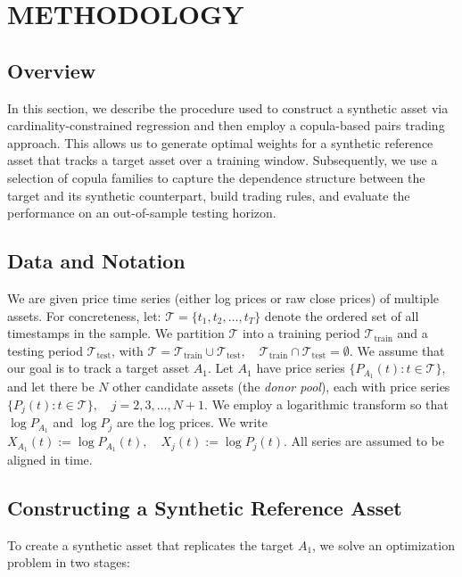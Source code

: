 
\maketitle

\section*{METHODOLOGY}

\subsection*{Overview}
In this section, we describe the procedure used to construct a synthetic asset via cardinality-constrained regression and then employ a copula-based pairs trading approach. This allows us to generate optimal weights for a synthetic reference asset that tracks a target asset over a training window. Subsequently, we use a selection of copula families to capture the dependence structure between the target and its synthetic counterpart, build trading rules, and evaluate the performance on an out-of-sample testing horizon.

\subsection*{Data and Notation}
We are given price time series (either log prices or raw close prices) of multiple assets. For concreteness, let:
$
\mathcal{T} = \{ t_1, t_2, \ldots, t_{T}\}
$
denote the ordered set of all timestamps in the sample. We partition $\mathcal{T}$ into a training period $\mathcal{T}_{\text{train}}$ and a testing period $\mathcal{T}_{\text{test}}$, with 
$
\mathcal{T} = \mathcal{T}_{\text{train}} \cup \mathcal{T}_{\text{test}}, 
\quad \mathcal{T}_{\text{train}} \cap \mathcal{T}_{\text{test}} = \emptyset.
$
We assume that our goal is to track a target asset $A_1$. Let $A_1$ have price series
$
\{P_{A_1}(t) : t\in \mathcal{T}\},
$
and let there be $N$ other candidate assets (the \emph{donor pool}), each with price series 
$
\{P_{j}(t) : t\in \mathcal{T}\}, \quad j = 2,3,\ldots, N+1.
$
We employ a logarithmic transform so that $\log P_{A_1}$ and $\log P_j$ are the log prices. We write
$
X_{A_1}(t) := \log P_{A_1}(t), 
\quad 
X_{j}(t) := \log P_j(t).
$
All series are assumed to be aligned in time.

\subsection*{Constructing a Synthetic Reference Asset}
To create a synthetic asset that replicates the target $A_1$, we solve an optimization problem in two stages:

